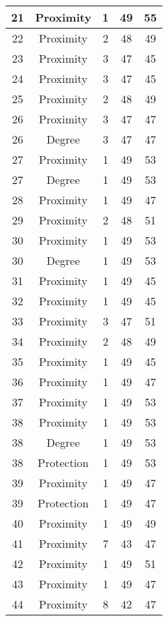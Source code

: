 \documentclass[results.tex]{subfiles}
\begin{document}
\begin{center}
\begin{tabular}{| c || c | c | c | c |}
    \hline
    21 & Proximity & 1 & 49 & 55 \\ 
    \hline
    22 & Proximity & 2 & 48 & 49 \\ 
    \hline
    23 & Proximity & 3 & 47 & 45 \\ 
    \hline
    24 & Proximity & 3 & 47 & 45 \\ 
    \hline
    25 & Proximity & 2 & 48 & 49 \\ 
    \hline
    26 & Proximity & 3 & 47 & 47 \\ 
    \hline
    26 & Degree & 3 & 47 & 47 \\ 
    \hline
    27 & Proximity & 1 & 49 & 53 \\ 
    \hline
    27 & Degree & 1 & 49 & 53 \\ 
    \hline
    28 & Proximity & 1 & 49 & 47 \\ 
    \hline
    29 & Proximity & 2 & 48 & 51 \\ 
    \hline
    30 & Proximity & 1 & 49 & 53 \\ 
    \hline
    30 & Degree & 1 & 49 & 53 \\ 
    \hline
    31 & Proximity & 1 & 49 & 45 \\ 
    \hline
    32 & Proximity & 1 & 49 & 45 \\ 
    \hline
    33 & Proximity & 3 & 47 & 51 \\ 
    \hline
    34 & Proximity & 2 & 48 & 49 \\ 
    \hline
    35 & Proximity & 1 & 49 & 45 \\ 
    \hline
    36 & Proximity & 1 & 49 & 47 \\ 
    \hline
    37 & Proximity & 1 & 49 & 53 \\ 
    \hline
    38 & Proximity & 1 & 49 & 53 \\ 
    \hline
    38 & Degree & 1 & 49 & 53 \\ 
    \hline
    38 & Protection & 1 & 49 & 53 \\ 
    \hline
    39 & Proximity & 1 & 49 & 47 \\ 
    \hline
    39 & Protection & 1 & 49 & 47 \\ 
    \hline
    40 & Proximity & 1 & 49 & 49 \\ 
    \hline
    41 & Proximity & 7 & 43 & 47 \\ 
    \hline
    42 & Proximity & 1 & 49 & 51 \\ 
    \hline
    43 & Proximity & 1 & 49 & 47 \\ 
    \hline
    44 & Proximity & 8 & 42 & 47 \\ 

\end{tabular}
\end{center}
\end{document}
